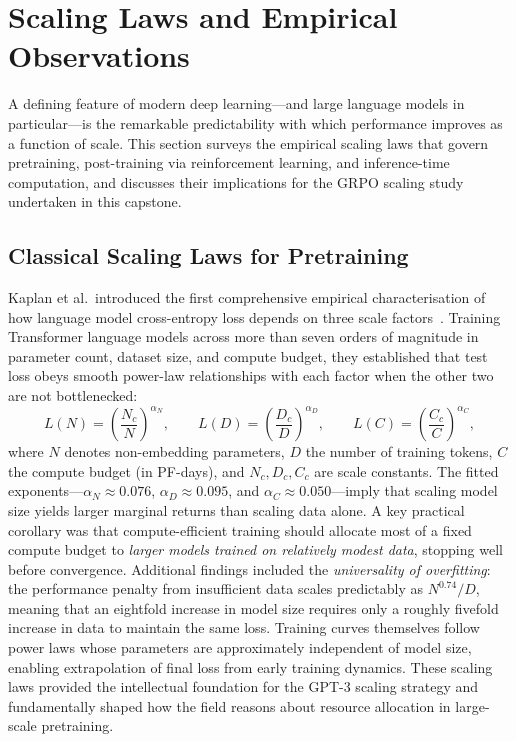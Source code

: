 \section{Scaling Laws and Empirical Observations}
\label{sec:scaling-laws}

A defining feature of modern deep learning---and large language models in
particular---is the remarkable predictability with which performance improves as
a function of scale.  This section surveys the empirical scaling laws that
govern pretraining, post-training via reinforcement learning, and inference-time
computation, and discusses their implications for the GRPO scaling study
undertaken in this capstone.

\subsection{Classical Scaling Laws for Pretraining}

Kaplan et al.\ introduced the first comprehensive empirical characterisation of
how language model cross-entropy loss depends on three scale
factors~\cite{kaplan2020scaling}.  Training Transformer language models across
more than seven orders of magnitude in parameter count, dataset size, and
compute budget, they established that test loss obeys smooth power-law
relationships with each factor when the other two are not bottlenecked:
\begin{equation}
  L(N) = \left(\frac{N_c}{N}\right)^{\!\alpha_N}\!,\qquad
  L(D) = \left(\frac{D_c}{D}\right)^{\!\alpha_D}\!,\qquad
  L(C) = \left(\frac{C_c}{C}\right)^{\!\alpha_C}\!,
  \label{eq:kaplan-power-laws}
\end{equation}
where $N$ denotes non-embedding parameters, $D$ the number of training tokens,
$C$ the compute budget (in PF-days), and $N_c, D_c, C_c$ are scale constants.
The fitted exponents---$\alpha_N \approx 0.076$, $\alpha_D \approx 0.095$, and
$\alpha_C \approx 0.050$---imply that scaling model size yields larger marginal
returns than scaling data alone.  A key practical corollary was that
compute-efficient training should allocate most of a fixed compute budget to
\emph{larger models trained on relatively modest data}, stopping well before
convergence.  Additional findings included the \emph{universality of
overfitting}: the performance penalty from insufficient data scales predictably
as $N^{0.74}/D$, meaning that an eightfold increase in model size requires only
a roughly fivefold increase in data to maintain the same loss.  Training curves
themselves follow power laws whose parameters are approximately independent of
model size, enabling extrapolation of final loss from early training dynamics.
These scaling laws provided the intellectual foundation for the GPT-3 scaling
strategy and fundamentally shaped how the field reasons about resource
allocation in large-scale pretraining.


